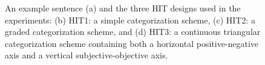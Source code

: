 \documentclass[11pt,letterpaper]{article}
\begin{document}
\begin{figure}
  \begin{center}
	\caption{An example sentence (a) and the three HIT designs used in the experiments: (b) HIT1: a simple categorization scheme, (c) HIT2: a graded categorization scheme, and (d) HIT3: a continuous triangular categorization scheme containing both a horizontal positive-negative axis and a vertical subjective-objective axis.}
	\label{hits}
  \end{center}
\end{figure}
\end{document}
